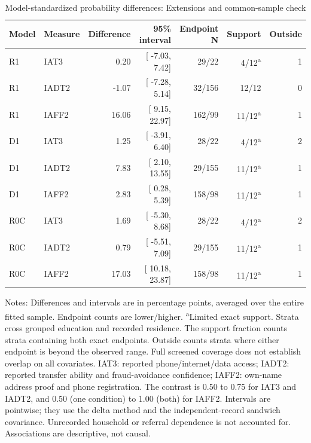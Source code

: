 \begin{table}[tbp]\centering\small
\caption{Model-standardized probability differences: Extensions and common-sample check}\label{tab:det-checks}
\begin{tabular}{llrrrrr}\toprule
Model & Measure & Difference & 95\% interval & Endpoint N & Support & Outside \\
\midrule
R1 & IAT3 &   0.20 & [ -7.03,   7.42] & 29/22 & 4/12\textsuperscript{a} & 1 \\
R1 & IADT2 &  -1.07 & [ -7.28,   5.14] & 32/156 & 12/12 & 0 \\
R1 & IAFF2 &  16.06 & [  9.15,  22.97] & 162/99 & 11/12\textsuperscript{a} & 1 \\
D1 & IAT3 &   1.25 & [ -3.91,   6.40] & 28/22 & 4/12\textsuperscript{a} & 2 \\
D1 & IADT2 &   7.83 & [  2.10,  13.55] & 29/155 & 11/12\textsuperscript{a} & 1 \\
D1 & IAFF2 &   2.83 & [  0.28,   5.39] & 158/98 & 11/12\textsuperscript{a} & 1 \\
R0C & IAT3 &   1.69 & [ -5.30,   8.68] & 28/22 & 4/12\textsuperscript{a} & 2 \\
R0C & IADT2 &   0.79 & [ -5.51,   7.09] & 29/155 & 11/12\textsuperscript{a} & 1 \\
R0C & IAFF2 &  17.03 & [ 10.18,  23.87] & 158/98 & 11/12\textsuperscript{a} & 1 \\
\bottomrule\end{tabular}
\par\smallskip\begin{minipage}{0.96\linewidth}\footnotesize\raggedright Notes: Differences and intervals are in percentage points, averaged over the entire fitted sample. Endpoint counts are lower/higher. \textsuperscript{a}Limited exact support. Strata cross grouped education and recorded residence. The support fraction counts strata containing both exact endpoints. Outside counts strata where either endpoint is beyond the observed range. Full screened coverage does not establish overlap on all covariates. IAT3: reported phone/internet/data access; IADT2: reported transfer ability and fraud-avoidance confidence; IAFF2: own-name address proof and phone registration. The contrast is 0.50 to 0.75 for IAT3 and IADT2, and 0.50 (one condition) to 1.00 (both) for IAFF2. Intervals are pointwise; they use the delta method and the independent-record sandwich covariance. Unrecorded household or referral dependence is not accounted for. Associations are descriptive, not causal. \end{minipage}\end{table}
